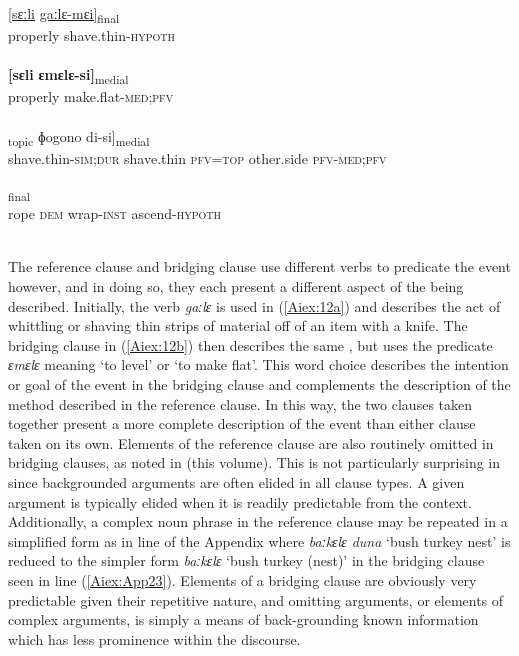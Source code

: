 \documentclass[output=paper]{LSP/langsci}
\begin{document}
\begin{exe}
\ex \label{Aiex:12ad}
\begin{xlist}
\ex \label{Aiex:12a}
\gll \underline{[sɛːli}	\underline{gaːlɛ-mɛi]}\textsubscript{final}\\
properly	shave.thin-\textsc{hypoth}\\
\glt {}\\
\ex \label{Aiex:12b}
\gll \textbf{[sɛli}	\textbf{ɛmɛlɛ-si]}\textsubscript{medial}\\
properly	make.flat-\textsc{med};\textsc{pfv}\\
\glt {}\\
\ex \label{Aiex:12c}
\gll [[gaːjɛ-liːː	gaːlɛ	di=jaː]\textsubscript{topic}	ɸogono	di-si]\textsubscript{medial}\\
shave.thin-\textsc{sim};\textsc{dur}	shave.thin	\textsc{pfv}=\textsc{top}	other.side	\textsc{pfv}-\textsc{med};\textsc{pfv}\\
\glt {}\\
\ex \label{Aiex:12d}
\textsubscript{final}\\
rope	\textsc{dem}	wrap-\textsc{inst}	ascend-\textsc{hypoth}\\
\glt	{}\\
\end{xlist}
\end{exe}

The reference clause and bridging clause use different verbs to predicate the event however, and in doing so, they each present a different aspect of the  being described. Initially, the verb  \textit{gaːlɛ} is used in (\ref{Aiex:12a}) and describes the act of whittling or shaving thin strips of material off of an item with a knife. The bridging clause in (\ref{Aiex:12b}) then describes the same , but uses the predicate \textit{ɛmɛlɛ} meaning `to level' or `to make flat'. This word choice describes the intention or goal of the event in the bridging clause and complements the description of the method described in the reference clause. In this way, the two clauses taken together present a more complete description of the event than either clause taken on its own. Elements of the reference clause are also routinely omitted in bridging clauses, as noted in \citeauthor{guerin18} (this volume). This is not particularly surprising in  since backgrounded arguments are often elided in all  clause types. A given argument is typically elided when it is readily predictable from the context. Additionally, a complex noun phrase in the reference clause may be repeated in a simplified form as in line  of the Appendix where \textit{baːkɛlɛ duna} `bush turkey nest' is reduced to the simpler form \textit{baːkɛlɛ} `bush turkey (nest)' in the bridging clause seen in line (\ref{Aiex:App23}). Elements of a bridging clause are obviously very predictable given their repetitive nature, and omitting arguments, or elements of complex arguments, is simply a means of back-grounding known information which has less prominence within the discourse.
\end{document}
